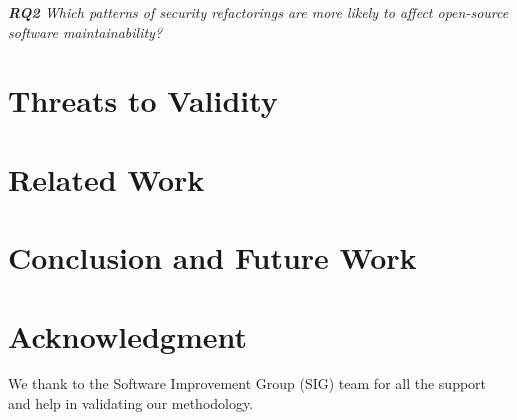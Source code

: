 \documentclass[10pt,conference]{IEEEtran}
\begin{document}
\begin{framed}
\textit{\textbf{RQ2} Which patterns of security refactorings are more likely to affect open-source software maintainability?}
\end{framed}



\section{Threats to Validity}\label{sec:threats}



\section{Related Work}\label{sec:rw}




\section{Conclusion and Future Work}\label{sec:conclusions}



\section*{Acknowledgment}\label{sec:ack}


We thank to the Software Improvement Group (SIG) team for all the support and help in validating our methodology.

{
 
  
}
\end{document}
